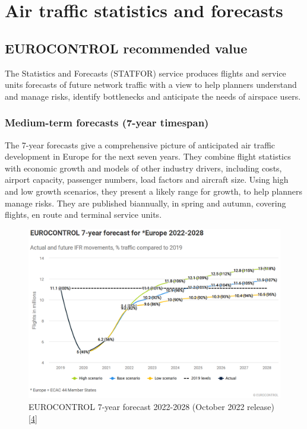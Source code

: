 \documentclass[
  11pt,
  a4paper,
]{book}
\begin{document}
\hypertarget{sec-air-traffic-statistics-and-forecasts}{%
\chapter{Air traffic statistics and
forecasts}\label{sec-air-traffic-statistics-and-forecasts}}

\hypertarget{eurocontrol-recommended-value}{%
\section{EUROCONTROL recommended
value}\label{eurocontrol-recommended-value}}

The Statistics and Forecasts (STATFOR) service produces flights and
service units forecasts of future network traffic with a view to help
planners understand and manage risks, identify bottlenecks and
anticipate the needs of airspace users.

\hypertarget{medium-term-forecasts-7-year-timespan}{%
\subsection{Medium-term forecasts (7-year
timespan)}\label{medium-term-forecasts-7-year-timespan}}

The 7-year forecasts give a comprehensive picture of anticipated air
traffic development in Europe for the next seven years. They combine
flight statistics with economic growth and models of other industry
drivers, including costs, airport capacity, passenger numbers, load
factors and aircraft size. Using high and low growth scenarios, they
present a likely range for growth, to help planners manage risks. They
are published biannually, in spring and autumn, covering flights, en
route and terminal service units.

\begin{figure}

{\centering \includegraphics{chapters/../figures/forecast_2022-2028.png}

}

\caption{\label{fig-forecast-2022-2028-plot}EUROCONTROL 7-year forecast
2022-2028 (October 2022 release)
\protect\hyperlink{ref-statfor:7year_forecast:2022-2028}{{[}4{]}}}

\end{figure}
\end{document}
